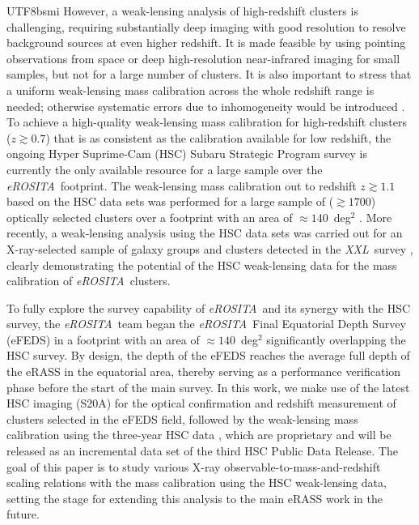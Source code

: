 \documentclass[longauth]{aa}
\newcommand{\redshift}{\ensuremath{z}}
\newcommand{\eROSITA}{\emph{eROSITA}}
\newcommand{\XXL}{\emph{XXL}}
\begin{document}
\begin{CJK*}{UTF8}{bsmi}
However,  a weak-lensing analysis of high-redshift clusters is challenging, requiring substantially deep imaging with good resolution to resolve background sources at even higher redshift.
It is made feasible by using pointing observations from space \citep{jee11,schrabback18,schrabback21} or deep high-resolution near-infrared imaging \citep{schrabback18b} for small samples, but not for a large number of clusters.
It is also important to stress that a uniform weak-lensing mass calibration  across the whole redshift range is needed; otherwise systematic errors due to inhomogeneity would be introduced \citep{chiu16a}.
To achieve a high-quality weak-lensing mass calibration for high-redshift clusters ($\redshift\gtrsim0.7$) that is as consistent as the calibration available for low redshift, the ongoing Hyper Suprime-Cam (HSC) Subaru Strategic Program survey \citep{aihara18a} is currently the only available resource for a large sample over the \eROSITA\ footprint.
The weak-lensing mass calibration out to redshift $\redshift\gtrsim1.1$ based on the HSC data sets was performed for a large sample of ($\gtrsim1700$) optically selected clusters over a footprint with an area of $\approx140$~deg$^2$ \citep{murata19}.
More recently, a weak-lensing analysis using the HSC data sets was carried out for an X-ray-selected sample of galaxy groups and clusters detected in the \XXL\ survey \citep{umetsu20}, clearly demonstrating the potential of the HSC weak-lensing data for the mass calibration of \eROSITA\ clusters.


To fully explore the survey capability of \eROSITA\ and its synergy with the HSC survey, the \eROSITA\ team began  the \eROSITA\ Final Equatorial Depth Survey (eFEDS) in a footprint with an area of $\approx140$~deg$^2$  significantly overlapping the HSC survey.
By design, the depth of the eFEDS reaches the average full depth of the eRASS in the equatorial area, thereby serving as a performance verification phase before the start of the main survey.
In this work, we make use of the latest HSC imaging (S20A) for the optical confirmation and redshift measurement of clusters selected in the eFEDS field, followed by the weak-lensing mass calibration using the three-year HSC data \citep[S19A][]{li21}, which are proprietary and will be released as an incremental data set of the third HSC Public Data Release.
The goal of this paper is to study various X-ray observable-to-mass-and-redshift scaling relations with the mass calibration using the HSC weak-lensing data, setting the stage for extending this analysis to the main eRASS work in the future.


\end{CJK*}
\end{document}
